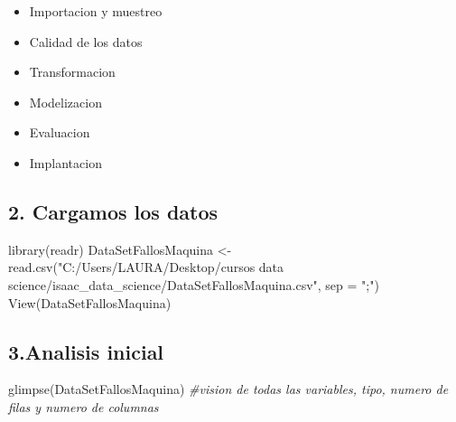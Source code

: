 \documentclass[
]{article}
\newenvironment{Shaded}{\begin{snugshade}}{\end{snugshade}}
\newcommand{\AttributeTok}[1]{\textcolor[rgb]{0.77,0.63,0.00}{#1}}
\newcommand{\CommentTok}[1]{\textcolor[rgb]{0.56,0.35,0.01}{\textit{#1}}}
\newcommand{\FunctionTok}[1]{\textcolor[rgb]{0.00,0.00,0.00}{#1}}
\newcommand{\NormalTok}[1]{#1}
\newcommand{\OtherTok}[1]{\textcolor[rgb]{0.56,0.35,0.01}{#1}}
\newcommand{\StringTok}[1]{\textcolor[rgb]{0.31,0.60,0.02}{#1}}
\providecommand{\tightlist}{%
  \setlength{\itemsep}{0pt}\setlength{\parskip}{0pt}}
\begin{document}
\begin{itemize}
\tightlist
\item
  Importacion y muestreo
\item
  Calidad de los datos
\item
  Transformacion
\item
  Modelizacion
\item
  Evaluacion
\item
  Implantacion
\end{itemize}

\hypertarget{cargamos-los-datos}{%
\subsection{2. Cargamos los datos}\label{cargamos-los-datos}}

\begin{Shaded}
\begin{Highlighting}[]
\FunctionTok{library}\NormalTok{(readr)}
\NormalTok{DataSetFallosMaquina }\OtherTok{\textless{}{-}} \FunctionTok{read.csv}\NormalTok{(}\StringTok{"C:/Users/LAURA/Desktop/cursos data science/isaac\_data\_science/DataSetFallosMaquina.csv"}\NormalTok{, }
    \AttributeTok{sep =} \StringTok{";"}\NormalTok{)}
\FunctionTok{View}\NormalTok{(DataSetFallosMaquina)}
\end{Highlighting}
\end{Shaded}

\hypertarget{analisis-inicial}{%
\subsection{3.Analisis inicial}\label{analisis-inicial}}

\begin{Shaded}
\begin{Highlighting}[]
\FunctionTok{glimpse}\NormalTok{(DataSetFallosMaquina) }\CommentTok{\#vision de todas las variables, tipo, numero de filas y numero de columnas}
\end{Highlighting}
\end{Shaded}
\end{document}
